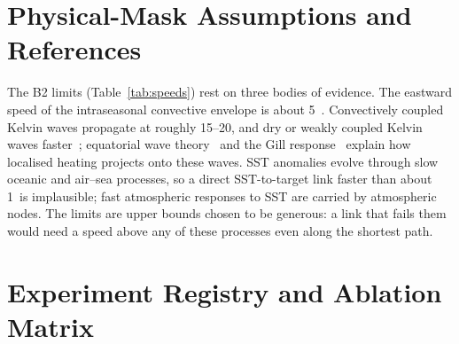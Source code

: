 \section{Physical-Mask Assumptions and References}
\label{app:mask}

The B2 limits (Table~\ref{tab:speeds}) rest on three bodies of evidence. The eastward speed of the intraseasonal convective envelope is about 5\ms~\cite{zhang2005mjo,lee2013realtime}. Convectively coupled Kelvin waves propagate at roughly 15--20\ms, and dry or weakly coupled Kelvin waves faster~\cite{wheeler1999convectively,kiladis2009convectively}; equatorial wave theory~\cite{matsuno1966quasi} and the Gill response~\cite{gill1980simple} explain how localised heating projects onto these waves. SST anomalies evolve through slow oceanic and air--sea processes, so a direct SST-to-target link faster than about 1\ms\ is implausible; fast atmospheric responses to SST are carried by atmospheric nodes. The limits are upper bounds chosen to be generous: a link that fails them would need a speed above any of these processes even along the shortest path.

\section{Experiment Registry and Ablation Matrix}
\label{app:registry}

